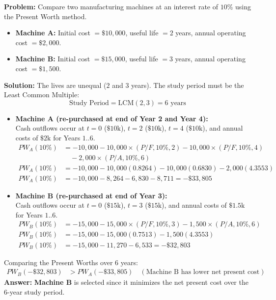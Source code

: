 \documentclass[12pt,a4paper]{article}
\begin{document}
\begin{tcolorbox}[examplebox, title={Example 2: Mutually Exclusive Projects with Unequal Lives}]
\textbf{Problem:} Compare two manufacturing machines at an interest rate of $10\%$ using the Present Worth method.
\begin{itemize}[leftmargin=*, itemsep=3pt, topsep=2pt]
  \item \textbf{Machine A:} Initial cost $= \$10,000$, useful life $= 2$ years, annual operating cost $= \$2,000$.
  \item \textbf{Machine B:} Initial cost $= \$15,000$, useful life $= 3$ years, annual operating cost $= \$1,500$.
\end{itemize}
\vspace{4pt}
\textbf{Solution:}
The lives are unequal ($2$ and $3$ years). The study period must be the Least Common Multiple:
\begin{equation*}
  \text{Study Period} = \text{LCM}(2, 3) = 6 \text{ years}
\end{equation*}
\begin{itemize}[leftmargin=*, itemsep=8pt]
  \item \textbf{Machine A (re-purchased at end of Year 2 and Year 4):} \\
    Cash outflows occur at $t=0$ ($\$10\text{k}$), $t=2$ ($\$10\text{k}$), $t=4$ ($\$10\text{k}$), and annual costs of $\$2\text{k}$ for Years $1..6$.
    \begin{align*}
      PW_A(10\%) &= -10,000 - 10,000 \times (P/F, 10\%, 2) - 10,000 \times (P/F, 10\%, 4) \\
                 & \quad - 2,000 \times (P/A, 10\%, 6) \\
      PW_A(10\%) &= -10,000 - 10,000(0.8264) - 10,000(0.6830) - 2,000(4.3553) \\
      PW_A(10\%) &= -10,000 - 8,264 - 6,830 - 8,711 = -\$33,805
    \end{align*}
  \item \textbf{Machine B (re-purchased at end of Year 3):} \\
    Cash outflows occur at $t=0$ ($\$15\text{k}$), $t=3$ ($\$15\text{k}$), and annual costs of $\$1.5\text{k}$ for Years $1..6$.
    \begin{align*}
      PW_B(10\%) &= -15,000 - 15,000 \times (P/F, 10\%, 3) - 1,500 \times (P/A, 10\%, 6) \\
      PW_B(10\%) &= -15,000 - 15,000(0.7513) - 1,500(4.3553) \\
      PW_B(10\%) &= -15,000 - 11,270 - 6,533 = -\$32,803
    \end{align*}
\end{itemize}
Comparing the Present Worths over 6 years:
\begin{align*}
  PW_B (-\$32,803) &> PW_A (-\$33,805) \quad (\text{Machine B has lower net present cost})
\end{align*}
\textbf{Answer:} \textbf{Machine B} is selected since it minimizes the net present cost over the 6-year study period.
\end{tcolorbox}
\end{document}
